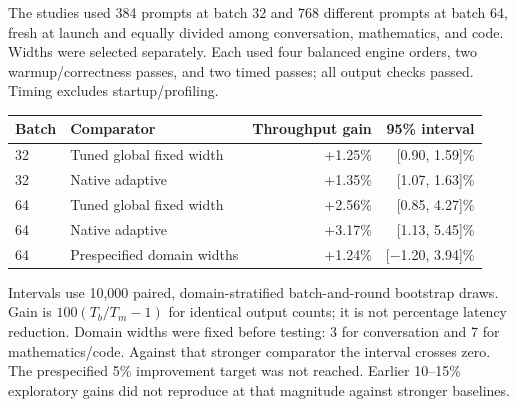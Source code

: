 \documentclass[10pt]{article}
\begin{document}
The studies used 384 prompts at batch 32 and 768 different prompts at batch 64, fresh at launch and equally divided among conversation, mathematics, and code. Widths were selected separately. Each used four balanced engine orders, two warmup/correctness passes, and two timed passes; all output checks passed. Timing excludes startup/profiling.
\begin{center}
\begin{tabular}{@{}llrr@{}}
\toprule
Batch & Comparator & Throughput gain & 95\% interval \\
\midrule
32 & Tuned global fixed width & +1.25\% & [0.90, 1.59]\% \\
32 & Native adaptive & +1.35\% & [1.07, 1.63]\% \\
64 & Tuned global fixed width & +2.56\% & [0.85, 4.27]\% \\
64 & Native adaptive & +3.17\% & [1.13, 5.45]\% \\
64 & Prespecified domain widths & +1.24\% & [$-$1.20, 3.94]\% \\
\bottomrule
\end{tabular}
\end{center}
Intervals use 10,000 paired, domain-stratified batch-and-round bootstrap draws. Gain is $100(T_b/T_m-1)$ for identical output counts; it is not percentage latency reduction. Domain widths were fixed before testing: 3 for conversation and 7 for mathematics/code. Against that stronger comparator the interval crosses zero. The prespecified 5\% improvement target was not reached. Earlier 10--15\% exploratory gains did not reproduce at that magnitude against stronger baselines.
\end{document}
